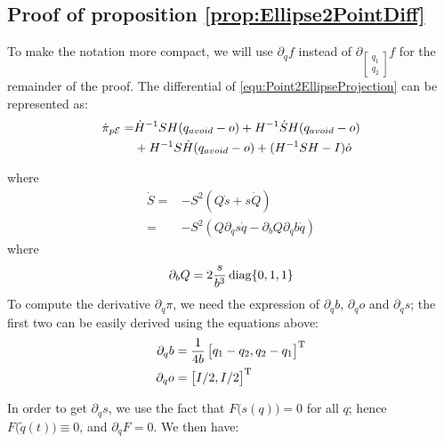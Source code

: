 \documentclass[journal]{IEEEtran}  %
\begin{document}
  \subsection{Proof of proposition \ref{prop:Ellipse2PointDiff}}\label{proof:Ellipse2PointDiff}
      To make the notation more compact, we will use $\partial_q f$ instead of $\partial_{\left[\begin{smallmatrix}q_1\\q_2\end{smallmatrix}\right]} f$ for the remainder of the proof.
    The differential of \eqref{equ:Point2EllipseProjection} can be represented as:
    \begin{equation}\label{equ:dPi_dt}
      \begin{split}
        \dot \pi_{p\mathcal{E}} = &  \dot H^{-1}SH (q_{avoid} - o)  + H^{-1}\dot S H (q_{avoid} - o) \\
        &+ H^{-1}S \dot H (q_{avoid} - o) + (H^{-1}SH -I)\dot o\\
      \end{split}
    \end{equation}

    where
    \begin{equation}\label{equ:S_dot}
      \begin{split}
        \dot S  =& - S^2 (Q \dot s + s \dot Q)\\
        =& - S^2 (Q \partial_q s \dot q - \partial_b Q \partial_q b \dot q)
      \end{split}
    \end{equation}
    where
    \begin{equation}
      \partial_b Q = 2\frac{s}{b^3} \operatorname{diag}\{0,1,1\}
    \end{equation}
    To compute the derivative $\partial_q \pi$, we need the expression of $\partial_q b$, $\partial_q o$ and $\partial_q s$; the first two can be easily derived using the equations above:
    \begin{align}
      \partial_q b &= \frac{1}{4b}\begin{bmatrix}q_1-q_2,q_2-q_1\end{bmatrix}^\mathrm{T}\\
      \partial_q o &= \begin{bmatrix}I/2,I/2\end{bmatrix}^\mathrm{T}
    \end{align}

    In order to get $\partial_q s$, we use the fact that $F\bigl(s(q)\bigr)=0$ for all $q$; hence $F\bigl(\tilde{q}(t)\bigr)\equiv 0$, and $\partial_q F = 0$. We then have:
\end{document}
